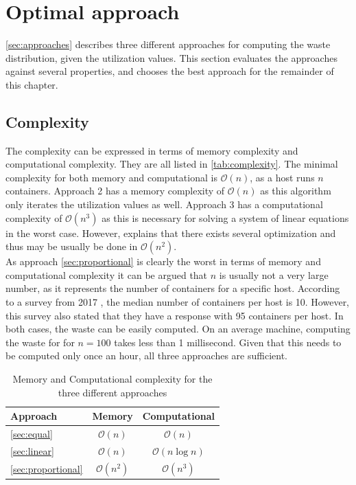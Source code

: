 \section{Optimal approach} \label{sec:optimal_approach}
\autoref{sec:approaches} describes three different approaches for computing the waste distribution, given the utilization values. This section evaluates the approaches against several properties, and chooses the best approach for the remainder of this chapter.

\subsection{Complexity}
The complexity can be expressed in terms of memory complexity and computational complexity. They are all listed in \autoref{tab:complexity}. The minimal complexity for both memory and computational is $\mathcal{O}(n)$, as a host runs $n$ containers. Approach 2 has a memory complexity of $\mathcal{O}(n)$ as this algorithm only iterates the utilization values as well. Approach 3 has a computational complexity of $\mathcal{O}(n^3)$ as this is necessary for solving a system of linear equations in the worst case. However, \cite{pan1991complexity} explains that there exists several optimization and thus may be usually be done in $\mathcal{O}(n^2)$.\\

\noindent
As approach \ref{sec:proportional} is clearly the worst in terms of memory and computational complexity it can be argued that $n$ is usually not a very large number, as it represents the number of containers for a specific host. According to a survey from 2017 \cite{docker_report}, the median number of containers per host is 10. However, this survey also stated that they have a response with 95 containers per host. In both cases, the waste can be easily computed. On an average machine, computing the waste for for $n = 100$ takes less than 1 millisecond. Given that this needs to be computed only once an hour, all three approaches are sufficient.

\begin{table}[ht]
    \centering
    \begin{tabular}{l|c|c}
        \textbf{Approach} & \textbf{Memory} & \textbf{Computational} \\ \hline
        \ref{sec:equal} & $\mathcal{O}(n)$ & $\mathcal{O}(n)$ \\
        \ref{sec:linear} & $\mathcal{O}(n)$ & $\mathcal{O}(n \log n)$ \\
        \ref{sec:proportional} & $\mathcal{O}(n^2)$ & $\mathcal{O}(n^3)$ \\
    \end{tabular}
    \caption{Memory and Computational complexity for the three different approaches}
    \label{tab:complexity}
\end{table}

